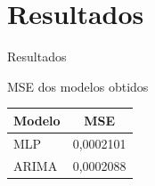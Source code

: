 \documentclass[compress,aspectratio=149,brazil]{beamer}
\begin{document}
\section{Resultados}

\begin{frame}{Resultados}
    \begin{block}{MSE dos modelos obtidos}
        \begin{center}
            \begin{tabular}{ll}
                \multicolumn{1}{c}{Modelo} & \multicolumn{1}{c}{MSE} \\
                \toprule
                MLP                        & 0,0002101               \\
                ARIMA                      & 0,0002088
            \end{tabular}
        \end{center}
    \end{block}
\end{frame}
\end{document}
